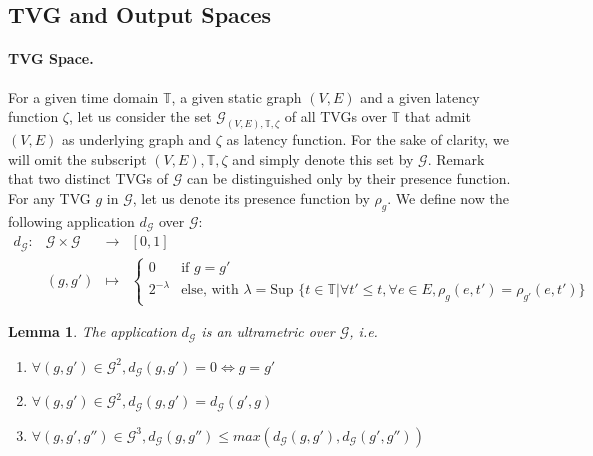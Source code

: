 \documentclass[11pt]{article}
\newtheorem{lemma}{Lemma}
\begin{document}
\subsection{TVG and Output Spaces}\label{sub:spaces}

\paragraph{TVG Space.} For a given time domain $\mathbb{T}$, a given static graph $(V,E)$ and a given latency function $\zeta$, let us consider the set $\mathcal{G}_{(V,E),\mathbb{T},\zeta}$ of all TVGs over $\mathbb{T}$ that admit $(V,E)$ as underlying graph and $\zeta$ as latency function. For the sake of clarity, we will omit the subscript $(V,E),\mathbb{T},\zeta$ and simply denote this set by $\mathcal{G}$. Remark that two distinct TVGs of $\mathcal{G}$ can be distinguished only by their presence function. For any TVG $g$ in $\mathcal{G}$, let us denote its presence function by $\rho_g$. We define now the following application $d_\mathcal{G}$ over $\mathcal{G}$:
\[\begin{array}{rrcl}
d_\mathcal{G} : & \mathcal{G}\times\mathcal{G} & \longrightarrow & [0,1] \\
    & (g,g')                       & \mapsto &
\left\{\begin{array}{cl}
0 & \text{if } g=g'\\
2^{-\lambda} & \text{else, with } \lambda = \text{Sup }\{ t\in\mathbb{T}|\forall t'\leq t,\forall e\in E,\rho_g(e,t') = \rho_{g'}(e,t')\}
\end{array}\right.
\end{array}\]

\begin{lemma}\label{lem:dgultrametric}
The application $d_\mathcal{G}$ is an ultrametric over $\mathcal{G}$, \emph{i.e.}
\begin{enumerate}
\item $\forall (g,g')\in\mathcal{G}^2, d_\mathcal{G}(g,g')=0 \Leftrightarrow g=g'$
\item $\forall (g,g')\in\mathcal{G}^2, d_\mathcal{G}(g,g')=d_\mathcal{G}(g',g)$
\item $\forall (g,g',g'')\in\mathcal{G}^3, d_\mathcal{G}(g,g'') \leq max(d_\mathcal{G}(g,g'), d_\mathcal{G}(g',g''))$
\end{enumerate}
\end{lemma} 
\end{document}
